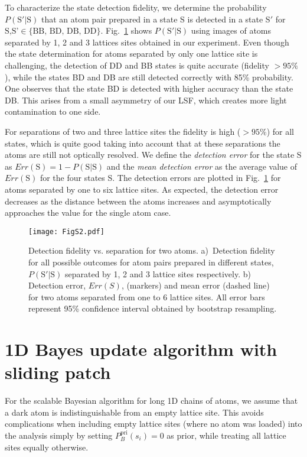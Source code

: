\documentclass[aps,prl,twocolumn,english,showpacs]{revtex4-1}
\begin{document}
To characterize the state detection fidelity, we determine the probability $P(\text{S$'$}|\text{S})$ that an atom pair prepared in a state S is detected in a state S$'$ for ${\text{S,S'}\in\{\text{BB, BD, DB, DD}\}}$. Fig.~\ref{fig:fig7} shows $P(\text{S$'$}|\text{S})$ using images of atoms separated by 1, 2 and 3 lattices sites obtained in our experiment. Even though the state determination for atoms separated by only one lattice site is challenging, the detection of DD and BB states is quite accurate (fidelity $>95\%$), while the states BD and DB are still detected correctly with 85\% probability. One observes that the state BD is detected with higher accuracy than the state DB. This arises from a small asymmetry of our LSF, which creates more light contamination to one side.

For separations of two and three lattice sites the fidelity is high ($>95\%$) for all states, which is quite good taking into account that at these separations the atoms are still not optically resolved. We define the \textit{detection error} for the state S as $Err(\text{S})= 1-P(\text{S}|\text{S})$ and the \emph{mean detection error} as the average value of $Err(\text{S})$ for the four states S. The detection errors are plotted in Fig.~\ref{fig:fig7} for atoms separated by one to six lattice sites.  As expected, the detection error decreases as the distance between the atoms increases and asymptotically approaches the value for the single atom case. 
\begin{figure}[t]
\centering
    \texttt{[image: FigS2.pdf]}
  	\caption[Setup] {Detection fidelity vs. separation for two atoms.
a)~Detection fidelity for all possible outcomes for atom pairs prepared in different states, $P(\text{S$'$}|\text{S})$ separated by 1, 2 and 3 lattice sites respectively. b) Detection error, $Err(S)$, (markers) and mean error (dashed line) for two atoms separated from one to 6 lattice sites. All error bars represent 95\% confidence interval obtained by bootstrap resampling.} {\label{fig:fig7}}
\end{figure}

\section{1D Bayes update algorithm with sliding patch }

For the scalable Bayesian algorithm for long 1D chains of atoms, we assume that a dark atom is indistinguishable from an empty lattice site. 
This avoids complications when including empty lattice sites (where no atom was loaded) into the analysis simply by setting $P^\text{pri}_B(s_{i})=0$ as prior, while treating all lattice sites equally otherwise.
\end{document}

